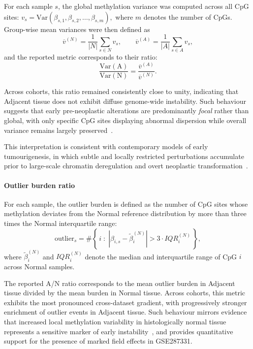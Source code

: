For each sample $s$, the global methylation variance was computed across all CpG sites:
$
v_s = \mathrm{Var}\!\left(\beta_{s,1}, \beta_{s,2}, \ldots, \beta_{s,m}\right),
$
where $m$ denotes the number of CpGs. Group-wise mean variances were then defined as
\begin{equation}
\overline{v}^{(N)} = \frac{1}{|N|} \sum_{s \in N} v_s,
\qquad
\overline{v}^{(A)} = \frac{1}{|A|} \sum_{s \in A} v_s,
\label{eq:group_mean_variance}
\end{equation}
and the reported metric corresponds to their ratio:
\begin{equation}
\mathrm{\frac{Var(A)}{Var(N)}} = 
\frac{\overline{v}^{(A)}}{\overline{v}^{(N)}}.
\label{eq:variance_ratio}
\end{equation}

Across cohorts, this ratio remained consistently close to unity, indicating that Adjacent tissue does not exhibit diffuse genome-wide instability.  
Such behaviour suggests that early pre-neoplastic alterations are predominantly \emph{focal} rather than global, with only specific CpG sites displaying abnormal dispersion while overall variance remains largely preserved~\cite{Yates2024_NormalMucosaField}.  

This interpretation is consistent with contemporary models of early tumourigenesis, in which subtle and locally restricted perturbations accumulate prior to large-scale chromatin deregulation and overt neoplastic transformation~\cite{Zhang2024_TumorInitiationEpigenetic}.


\paragraph{Outlier burden ratio}  
For each sample, the outlier burden is defined as the number of CpG sites whose methylation 
deviates from the Normal reference distribution by more than three times the Normal 
interquartile range:
\begin{equation}
\text{outlier}_s = 
\#\left\{\, i \;:\; 
\left| \beta_{i,s} - \tilde{\beta}^{(N)}_i \right| 
> 3 \cdot IQR^{(N)}_i \,\right\},
\label{eq:outlier_burden}
\end{equation}
where $\tilde{\beta}^{(N)}_i$ and $IQR^{(N)}_i$ denote the median and interquartile range of CpG $i$ 
across Normal samples.  

The reported A/N ratio corresponds to the mean outlier burden in Adjacent tissue divided by the 
mean burden in Normal tissue. Across cohorts, this metric exhibits the most pronounced cross-dataset gradient, with progressively stronger enrichment of outlier events in Adjacent tissue.  
Such behaviour mirrors evidence that increased local methylation variability in histologically normal tissue represents a sensitive marker of early instability~\cite{Yates2024_NormalMucosaField}, and provides quantitative support for the presence of marked field effects in GSE287331.

